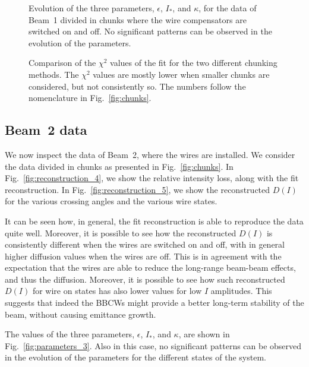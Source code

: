 \begin{figure}[hpt]
    \centering
    \caption{Evolution of the three parameters, $\epsilon$, $I_\ast$, and $\kappa$, for the data of Beam~1 divided in chunks where the wire compensators are switched on and off. No significant patterns can be observed in the evolution of the parameters.}
    \label{fig:parameters_2}
\end{figure}

\begin{figure}[hpt]
    \centering
    \caption{Comparison of the $\chi^2$ values of the fit for the two different chunking methods. The $\chi^2$ values are mostly lower when smaller chunks are considered, but not consistently so. The numbers follow the nomenclature in Fig.~\ref{fig:chunks}.}
    \label{fig:chi2}
\end{figure}

\subsection*{Beam~2 data}

We now inspect the data of Beam~2, where the wires are installed. We consider the data divided in chunks as presented in Fig.~\ref{fig:chunks}. In Fig.~\ref{fig:reconstruction_4}, we show the relative intensity loss, along with the fit reconstruction. In Fig.~\ref{fig:reconstruction_5}, we show the reconstructed $D(I)$ for the various crossing angles and the various wire states.

It can be seen how, in general, the fit reconstruction is able to reproduce the data quite well. Moreover, it is possible to see how the reconstructed $D(I)$ is consistently different when the wires are switched on and off, with in general higher diffusion values when the wires are off. This is in agreement with the expectation that the wires are able to reduce the long-range beam-beam effects, and thus the diffusion. Moreover, it is possible to see how such reconstructed $D(I)$ for wire on states has also lower values for low $I$ amplitudes. This suggests that indeed the BBCWs might provide a better long-term stability of the beam, without causing emittance growth.

The values of the three parameters, $\epsilon$, $I_\ast$, and $\kappa$, are shown in Fig.~\ref{fig:parameters_3}. Also in this case, no significant patterns can be observed in the evolution of the parameters for the different states of the system.

